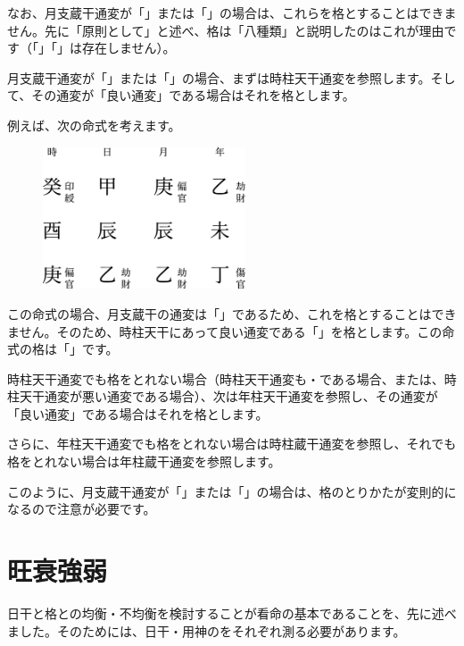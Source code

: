 \documentclass[a5paper,11pt,dvipdfmx]{tarticle}
\begin{document}
なお、月支蔵干通変が「」または「」の場合は、これらを格とすることはできません。先に「原則として」と述べ、格は「八種類」と説明したのはこれが理由です（「」「」は存在しません）。

月支蔵干通変が「」または「」の場合、まずは時柱天干通変を参照します。そして、その通変が「良い通変」である場合はそれを格とします。

例えば、次の命式を考えます。

\begin{figure}[h]
  \includegraphics[width=60mm,angle=90]{figs/figure5-8.eps}
\end{figure}

この命式の場合、月支蔵干の通変は「」であるため、これを格とすることはできません。そのため、時柱天干にあって良い通変である「」を格とします。この命式の格は「」です。

時柱天干通変でも格をとれない場合（時柱天干通変も・である場合、または、時柱天干通変が悪い通変である場合）、次は年柱天干通変を参照し、その通変が「良い通変」である場合はそれを格とします。

さらに、年柱天干通変でも格をとれない場合は時柱蔵干通変を参照し、それでも格をとれない場合は年柱蔵干通変を参照します。

このように、月支蔵干通変が「」または「」の場合は、格のとりかたが変則的になるので注意が必要です。



\clearpage

\section{旺衰強弱}

日干と格との均衡・不均衡を検討することが看命の基本であることを、先に述べました。そのためには、日干・用神のをそれぞれ測る必要があります。
\end{document}
